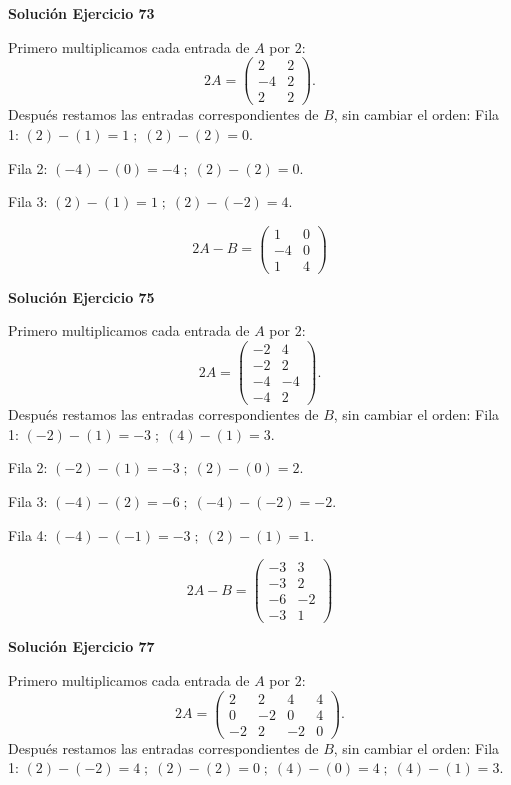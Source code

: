 \documentclass[12pt]{article}
\begin{document}
\par\bigskip\noindent\textbf{Solución Ejercicio 73}\par\nobreak
Primero multiplicamos cada entrada de $A$ por $2$:
\[
2A=\begin{pmatrix}2&2\\-4&2\\2&2\end{pmatrix}.
\]
Después restamos las entradas correspondientes de $B$, sin cambiar el orden:
Fila 1: $(2)-(1)=1\; ;\; (2)-(2)=0$.

Fila 2: $(-4)-(0)=-4\; ;\; (2)-(2)=0$.

Fila 3: $(2)-(1)=1\; ;\; (2)-(-2)=4$.

\[
\boxed{2A-B=\begin{pmatrix}1&0\\-4&0\\1&4\end{pmatrix}}
\]

\par\bigskip\noindent\textbf{Solución Ejercicio 75}\par\nobreak
Primero multiplicamos cada entrada de $A$ por $2$:
\[
2A=\begin{pmatrix}-2&4\\-2&2\\-4&-4\\-4&2\end{pmatrix}.
\]
Después restamos las entradas correspondientes de $B$, sin cambiar el orden:
Fila 1: $(-2)-(1)=-3\; ;\; (4)-(1)=3$.

Fila 2: $(-2)-(1)=-3\; ;\; (2)-(0)=2$.

Fila 3: $(-4)-(2)=-6\; ;\; (-4)-(-2)=-2$.

Fila 4: $(-4)-(-1)=-3\; ;\; (2)-(1)=1$.

\[
\boxed{2A-B=\begin{pmatrix}-3&3\\-3&2\\-6&-2\\-3&1\end{pmatrix}}
\]

\par\bigskip\noindent\textbf{Solución Ejercicio 77}\par\nobreak
Primero multiplicamos cada entrada de $A$ por $2$:
\[
2A=\begin{pmatrix}2&2&4&4\\0&-2&0&4\\-2&2&-2&0\end{pmatrix}.
\]
Después restamos las entradas correspondientes de $B$, sin cambiar el orden:
Fila 1: $(2)-(-2)=4\; ;\; (2)-(2)=0\; ;\; (4)-(0)=4\; ;\; (4)-(1)=3$.
\end{document}
